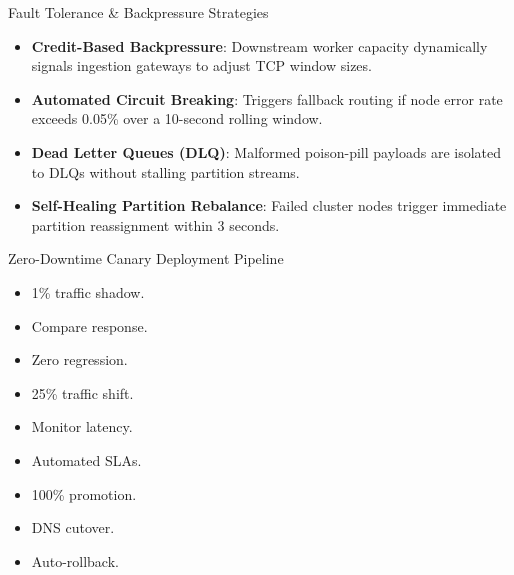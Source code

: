 \documentclass[
  style=simple,
  size=11pt,
  paper=screen,
  orient=landscape
]{powerdot}
\begin{document}
\begin{slide}{Fault Tolerance \& Backpressure Strategies}
\begin{itemize}
  \item \textbf{Credit-Based Backpressure}: Downstream worker capacity dynamically signals ingestion gateways to adjust TCP window sizes.
  \item \textbf{Automated Circuit Breaking}: Triggers fallback routing if node error rate exceeds 0.05\% over a 10-second rolling window.
  \item \textbf{Dead Letter Queues (DLQ)}: Malformed poison-pill payloads are isolated to DLQs without stalling partition streams.
  \item \textbf{Self-Healing Partition Rebalance}: Failed cluster nodes trigger immediate partition reassignment within 3 seconds.
\end{itemize}
\end{slide}

\begin{slide}{Zero-Downtime Canary Deployment Pipeline}
\begin{minipage}{0.32\textwidth}
\begin{tcolorbox}[monobox,title=Phase 1: Shadow]
\small
\begin{itemize}
  \item 1\% traffic shadow.
  \item Compare response.
  \item Zero regression.
\end{itemize}
\end{tcolorbox}
\end{minipage}%
\hfill
\begin{minipage}{0.32\textwidth}
\begin{tcolorbox}[monobox,title=Phase 2: Canary]
\small
\begin{itemize}
  \item 25\% traffic shift.
  \item Monitor latency.
  \item Automated SLAs.
\end{itemize}
\end{tcolorbox}
\end{minipage}%
\hfill
\begin{minipage}{0.32\textwidth}
\begin{tcolorbox}[monobox,title=Phase 3: Rollout]
\small
\begin{itemize}
  \item 100\% promotion.
  \item DNS cutover.
  \item Auto-rollback.
\end{itemize}
\end{tcolorbox}
\end{minipage}
\end{slide}
\end{document}
